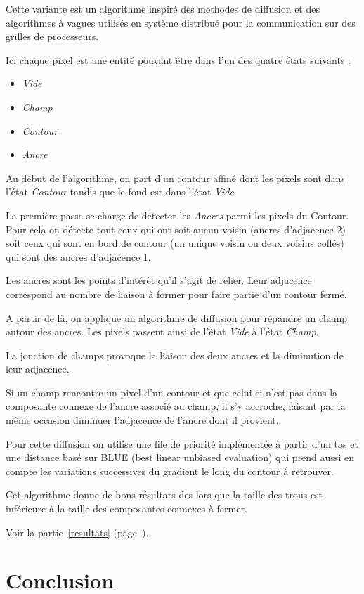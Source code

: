 Cette variante est un algorithme inspiré des methodes de diffusion et des algorithmes à vagues utilisés en système distribué pour la communication sur des grilles de processeurs.

Ici chaque pixel est une entité pouvant être dans l'un des quatre états suivants :
\begin{itemize}
	\item \emph{Vide}
	\item \emph{Champ}
	\item \emph{Contour}
	\item \emph{Ancre}
\end{itemize}

Au début de l'algorithme, on part d'un contour affiné dont les pixels sont dans l'état \emph{Contour} tandis que le fond est dans l'état \emph{Vide}.

La première passe se charge de détecter les \emph{Ancres} parmi les pixels du Contour. Pour cela on détecte tout ceux qui ont soit aucun voisin (ancres d'adjacence 2) soit ceux qui sont en bord de contour (un unique voisin ou deux voisins collés) qui sont des ancres d'adjacence 1.

Les ancres sont les points d'intérêt qu'il s'agit de relier. Leur adjacence correspond au nombre de liaison à former pour faire partie d'un contour fermé.

A partir de là, on applique un algorithme de diffusion pour répandre un champ autour des ancres. Les pixels passent ainsi de l'état \emph{Vide} à l'état \emph{Champ}.

La jonction de champs provoque la liaison des deux ancres et la diminution de leur adjacence.

Si un champ rencontre un pixel d'un contour et que celui ci n'est pas dans la composante connexe de l'ancre associé au champ, il s'y accroche, faisant par la même occasion diminuer l'adjacence de l'ancre dont il provient.

Pour cette diffusion on utilise une file de priorité implémentée à partir d'un tas et une distance basé sur \textsc{BLUE} (best linear unbiased evaluation) qui prend aussi en compte les variations successives du gradient le long du contour à retrouver.

Cet algorithme donne de bons résultats des lors que la taille des trous est inférieure à la taille des composantes connexes à fermer. 

Voir la partie~\ref{resultats} (page~\pageref{resultats}).

\section{Conclusion}

